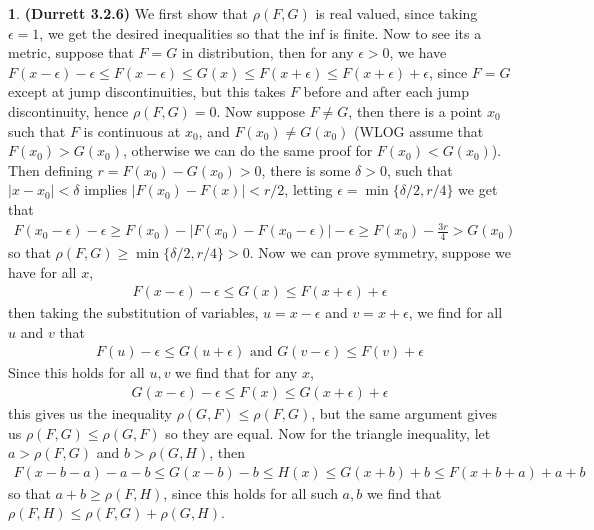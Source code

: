 \documentclass[10.5pt]{article}
\theoremstyle{definition}
\newtheorem{pb}{}
\newcommand{\set}[1]{\{#1\}}
\newcommand{\abs}[1]{\lvert#1\rvert}
\newcommand{\tand}{\text{ and }}
\begin{document}
    \begin{pb}\textbf{(Durrett 3.2.6)}
        We first show that \(\rho(F,G)\) is real valued, since taking \(\epsilon = 1\), we get the desired inequalities so that the inf is finite. Now to see its a metric, suppose that \(F = G\) in distribution, then for any \(\epsilon > 0\), we have \(F(x- \epsilon) -\epsilon \leq F(x - \epsilon) \leq G(x) \leq F(x + \epsilon) \leq F(x + \epsilon) + \epsilon\), since \(F = G\) except at jump discontinuities, but this takes \(F\) before and after each jump discontinuity, hence \(\rho(F,G) = 0\). Now suppose \(F \neq G\), then there is a point \(x_0\) such that \(F\) is continuous at \(x_0\), and \(F(x_0) \neq G(x_0)\) (WLOG assume that \(F(x_0) > G(x_0)\), otherwise we can do the same proof for \(F(x_0) < G(x_0)\)). Then defining \(r = F(x_0) - G(x_0) > 0\), there is some \(\delta > 0\), such that \(\abs{x-x_0} < \delta\) implies \(\abs{F(x_0) - F(x)} < r/2\), letting \(\epsilon = \min\set{\delta/2,r/4}\) we get that
        \begin{align*}
            F(x_0 - \epsilon) - \epsilon \geq F(x_0) - \abs{F(x_0) - F(x_0 - \epsilon)} - \epsilon \geq F(x_0) - \frac{3r}{4} > G(x_0)
        \end{align*}
        so that \(\rho(F,G) \geq \min\set{\delta/2,r/4} > 0\). Now we can prove symmetry, suppose we have for all \(x\),
        \begin{align*}
            F(x - \epsilon) - \epsilon \leq G(x) \leq F(x + \epsilon) + \epsilon
        \end{align*}
        then taking the substitution of variables, \(u = x - \epsilon\) and \(v = x + \epsilon\), we find for all \(u\) and \(v\) that
        \begin{align*}
            F(u) - \epsilon \leq G(u + \epsilon) \tand G(v - \epsilon) \leq F(v) + \epsilon
        \end{align*}
        Since this holds for all \(u,v\) we find that for any \(x\),
        \begin{align*}
            G(x - \epsilon) - \epsilon \leq F(x) \leq G(x + \epsilon) + \epsilon
        \end{align*}
        this gives us the inequality \(\rho(G,F) \leq \rho(F,G)\), but the same argument gives us \(\rho(F,G) \leq \rho(G,F)\) so they are equal. Now for the triangle inequality, let \(a > \rho(F,G)\) and \(b > \rho(G,H)\), then
        \begin{align*}
            F(x - b - a) - a - b \leq G(x - b) - b \leq H(x) \leq G(x + b) + b \leq F(x + b + a) + a + b
        \end{align*}
        so that \(a + b \geq \rho(F,H)\), since this holds for all such \(a,b\) we find that \(\rho(F,H) \leq \rho(F,G) + \rho(G,H)\).


\end{pb}
\end{document}
